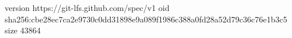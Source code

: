 version https://git-lfs.github.com/spec/v1
oid sha256:cbe28ec7ca2e9730c0dd31898e9a089f1986c388a0fd28a52d79c36c76e1b3c5
size 43864
